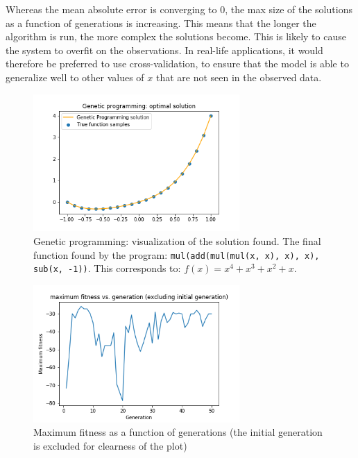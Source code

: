 \documentclass{article}
\begin{document}
Whereas the mean absolute error is converging to 0, the max size of the solutions as a function of generations is increasing. This means that the longer the algorithm is run, the more complex the solutions become. This is likely to cause the system to overfit on the observations. In real-life applications, it would therefore be preferred to use cross-validation, to ensure that the model is able to generalize well to other values of $x$ that are not seen in the observed data. 

\begin{figure}[H]
    \centering
    \includegraphics[width=0.7\textwidth]{Assignment 1/Figures/A1_8a3.png}
    \caption{Genetic programming: visualization of the solution found. The final function found by the program: \texttt{mul(add(mul(mul(x, x), x), x), sub(x, -1))}. This corresponds to: $f(x) = x^4+x^3+x^2+x$.}
    \label{fig:A1_8a3}
\end{figure}

 \begin{figure}[H]
    \centering
    \includegraphics[width=0.7\textwidth]{Assignment 1/Figures/A1_8a2.png}
    \caption{Maximum fitness as a function of generations (the initial generation is excluded for clearness of the plot)}
    \label{fig:A1_8a2}
\end{figure}
\end{document}
